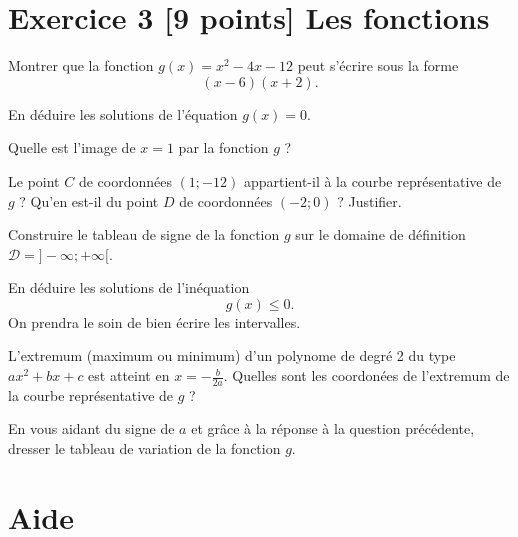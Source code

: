 \documentclass{exam}
\begin{document}
\section*{Exercice 3 [9 points] Les fonctions}

\begin{questions}
\question[2] Montrer que la fonction $g(x) = x^2 - 4x - 12$ peut s'écrire sous la forme 
\[
(x-6)(x+2).
\]

\question[0.5] En déduire les solutions de l'équation $g(x)=0$.

\question[0.5] Quelle est l'image de $x=1$ par la fonction $g$ ?

\question[1] Le point $C$ de coordonnées $(1 ; -12)$ appartient-il à la courbe représentative de $g$ ? Qu'en est-il du point $D$ de coordonnées $(-2 ; 0)$ ? Justifier.

\question[2] Construire le tableau de signe de la fonction $g$ sur le domaine de définition $\mathcal{D} = ] - \infty ; + \infty [$.

\question[1] En déduire les solutions de l'inéquation 
\[
g(x) \leq 0.
\]
On prendra le soin de bien écrire les intervalles.

\question[1] L'extremum (maximum ou minimum) d'un polynome de degré 2 du type $a x^2 + bx + c$ est atteint en $x= - \frac{b}{2a}$. Quelles sont les coordonées de l'extremum de la courbe représentative de $g$ ?

\question[1] En vous aidant du signe de $a$ et grâce à la réponse à la question précédente, dresser le tableau de variation de la fonction $g$.

\end{questions}

\section*{Aide}
\end{document}
